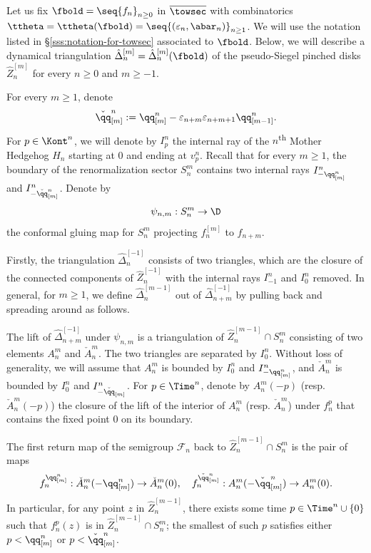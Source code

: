\documentclass{amsart}
\begin{document}
Let us fix $\fbold = \seq{f_n}_{n\geq 0}$ in $\overline{\towsec}$ with combinatorics $\ttheta = \ttheta(\fbold) = \seq{ (\varepsilon_n, \abar_n)}_{n\geq 1}$. 
We will use the notation listed in \S\ref{sss:notation-for-towsec} associated to $\fbold$.
Below, we will describe a dynamical triangulation 
$\hat{\Delta}^{[m]}_n = \hat{\Delta}^{[m]}_n(\fbold)$ 
of the pseudo-Siegel pinched disks $\hat{Z}^{[m]}_n$ for every $n \geq 0$ and $m \geq -1$.
 
For every $m \geq 1$, denote 
\[
    \check{\qq}^n_{[m]} := \qq^n_{[m]} - \varepsilon_{n+m} \varepsilon_{n+m+1} \qq^n_{[m-1]}.
\]
For $p \in \Kont^{n}$, we will denote by $I^n_p$ the internal ray of the $n$\textsuperscript{th} Mother Hedgehog $H_n$ starting at $0$ and ending at $v^n_p$.
Recall that for every $m \geq 1$, the boundary of the renormalization sector $S_n^m$ contains two internal rays $I^n_{-\qq^n_{[m]}}$ and $I^n_{-\check{\qq}^n_{[m]}}$.
Denote by
\[
\psi_{n,m} : S_n^m \to \D
\]
the conformal gluing map for $S_n^m$ projecting $f_n^{[m]}$ to $f_{n+m}$.

Firstly, the triangulation $\hat{\Delta}^{[-1]}_n$ consists of two triangles, which are the closure of the connected components of $\hat{Z}^{[-1]}_n$ with the internal rays $I^n_{-1}$ and $I^n_0$ removed.
In general, for $m \geq 1$, we define $\hat{\Delta}^{[m-1]}_n$ out of $\hat{\Delta}^{[-1]}_{n+m}$ by pulling back and spreading around as follows.

The lift of $\hat{\Delta}^{[-1]}_{n+m}$ under $\psi_{n,m}$ is a triangulation of $\hat{Z}_n^{[m-1]} \cap S_n^m$ consisting of two elements $A_n^m$ and $\check{A}_n^m$.
The two triangles are separated by $I^n_0$.
Without loss of generality, we will assume that $A_n^m$ is bounded by $I^n_0$ and $I^n_{-\qq^n_{[m]}}$, and $\check{A}_n^m$ is bounded by $I^n_0$ and $I^n_{-\check{\qq}_{[m]}}$.
For $p \in \Time^n$, denote by $A_n^m(-p)$ (resp. $\check{A}_n^m(-p)$) the closure of the lift of the interior of $A_n^m$ (resp. $\check{A}_n^m$) under $f_n^p$ that contains the fixed point $0$ on its boundary.

\begin{lemma}
\label{lem:triangulation-first-return}
    The first return map of the semigroup $\mathcal{F}_n$ back to $\hat{Z}_n^{[m-1]} \cap S_n^m$ is the pair of maps
    \[
        f_n^{\qq^n_{[m]}}: \check{A}_n^m (-\qq^n_{[m]}) \to \check{A}_n^m (0), \quad 
        f_n^{\check{\qq}^n_{[m]}}: A_n^m(-\check{\qq}^n_{[m]}) \to A_n^m(0).
    \]
    In particular, for any point $z$ in $\hat{Z}_n^{[m-1]}$, there exists some time $p \in \Time^n \cup \{0\}$ such that $f_n^p(z)$ is in $\hat{Z}_n^{[m-1]} \cap S_n^m$; the smallest of such $p$ satisfies either $p< \qq^n_{[m]}$ or $p < \check{\qq}^n_{[m]}$.
\end{lemma}
\end{document}
